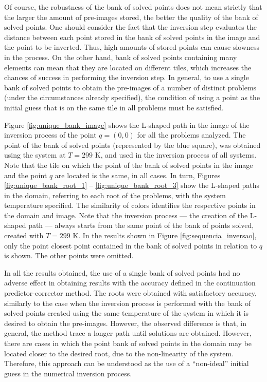 \documentclass[journal=iecred,manuscript=article]{achemso}
\theoremstyle{definition}
\theoremstyle{remark}
\begin{document}
Of course, the robustness of the bank of solved points does not mean strictly that the larger the amount of pre-images stored, the better the quality of the bank of solved points. One should consider the fact that the inversion step evaluates the distance between each point stored in the bank of solved points in the image and the point to be inverted. Thus, high amounts of stored points can cause slowness in the process. On the other hand, bank of solved points containing many elements can mean that they are located on different tiles, which increases the chances of success in performing the inversion step. In general, to use a single bank of solved points to obtain the pre-images of a number of distinct problems (under the circumstances already specified), the condition of using a point as the initial guess that is on the same tile in all problems must be satisfied.

Figure \ref{fig:unique_bank_image} shows the L-shaped path in the image of the inversion process of the point $ q = \left(0,0\right) $ for all the problems analyzed. The point of the bank of solved points (represented by the blue square), was obtained using the system at $ T = 299 $ K, and used in the inversion process of all systems. Note that the tile on which the point of the bank of solved points in the image and the point $ q $ are located is the same, in all cases. In turn, Figures \ref{fig:unique_bank_root_1} -- \ref{fig:unique_bank_root_3} show the L-shaped paths in the domain, referring to each root of the problems, with the system temperature specified. The similarity of colors identifies the respective points in the domain and image. Note that the inversion process --- the creation of the L-shaped path --- always starts from the same point of the bank of points solved, created with $ T = 299 $ K. In the results shown in Figure \ref{fig:sequencia_inversao}, only the point closest point contained in the bank of solved points in relation to $ q $ is shown. The other points were omitted.

In all the results obtained, the use of a single bank of solved points had no adverse effect in obtaining results with the accuracy defined in the continuation predictor-corrector method. The roots were obtained with satisfactory accuracy, similarly to the case when the inversion process is performed with the bank of solved points created using the same temperature of the system in which it is desired to obtain the pre-images. However, the observed difference is that, in general, the method trace a longer path until solutions are obtained. However, there are cases in which the point bank of solved points in the domain may be located closer to the desired root, due to the non-linearity of the system. Therefore, this approach can be understood as the use of a \enquote{non-ideal} initial guess in the numerical inversion process.
\end{document}
